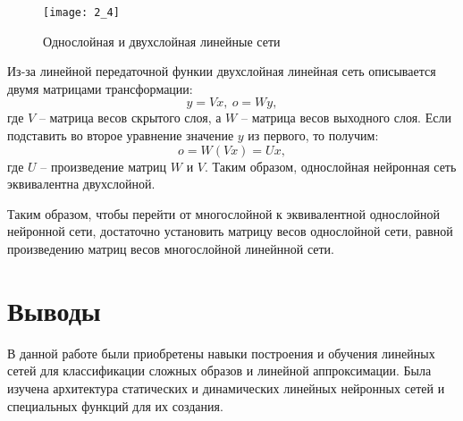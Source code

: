 \begin{figure}[H]
\begin{center}
	\texttt{[image: 2\_4]}
	\caption{Однослойная и двухслойная линейные сети}
	\label{fig:2_4}
\end{center}
\end{figure}

Из-за линейной передаточной функии двухслойная линейная сеть описывается двумя матрицами трансформации:
\begin{equation*}
y = Vx,\ o = Wy,
\end{equation*}
где $V$ -- матрица весов скрытого слоя, а $W$ -- матрица весов выходного слоя. Если подставить во второе уравнение значение $y$ из первого, то получим:
\begin{equation*}
o = W(Vx) = Ux,
\end{equation*}
где $U$ -- произведение матриц $W$ и $V$. Таким образом, однослойная нейронная сеть эквивалентна двухслойной.

Таким образом, чтобы перейти от многослойной к эквивалентной однослойной нейронной сети, достаточно установить матрицу весов однослойной сети, равной произведению матриц весов многослойной линейнной сети. 

\section{Выводы}

В данной работе были приобретены навыки построения и обучения линейных сетей для классификации сложных образов и линейной аппроксимации. Была изучена архитектура статических и динамических линейных нейронных сетей и специальных функций для их создания.

